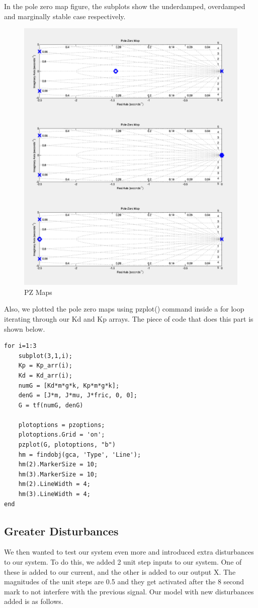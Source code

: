 In the pole zero map figure, the subplots show the underdamped, overdamped and marginally stable case respectively. 
\begin{figure}[H]
    \centering
    \includegraphics[width=.7\textwidth]{images/pzplot1.png}
    \caption{PZ Maps}
    \label{fig:pz}
\end{figure}

Also, we plotted the pole zero maps using pzplot() command inside a for loop iterating through our Kd and Kp arrays. The piece of code that does this part is shown below.



\begin{lstlisting}
for i=1:3
    subplot(3,1,i);
    Kp = Kp_arr(i);
    Kd = Kd_arr(i);
    numG = [Kd*m*g*k, Kp*m*g*k];
    denG = [J*m, J*mu, J*fric, 0, 0];
    G = tf(numG, denG)
    
    plotoptions = pzoptions;
    plotoptions.Grid = 'on';
    pzplot(G, plotoptions, "b")
    hm = findobj(gca, 'Type', 'Line');   
    hm(2).MarkerSize = 10;               
    hm(3).MarkerSize = 10; 
    hm(2).LineWidth = 4;
    hm(3).LineWidth = 4;
end
\end{lstlisting}



\subsection{Greater Disturbances}
We then wanted to test our system even more and introduced extra disturbances to our system. To do this, we added 2 unit step inputs to our system. One of these is added to our current, and the other is added to our output X. The magnitudes of the unit steps are 0.5 and they get activated after the 8 second mark to not interfere with the previous signal. Our model with new disturbances added is as follows. 

